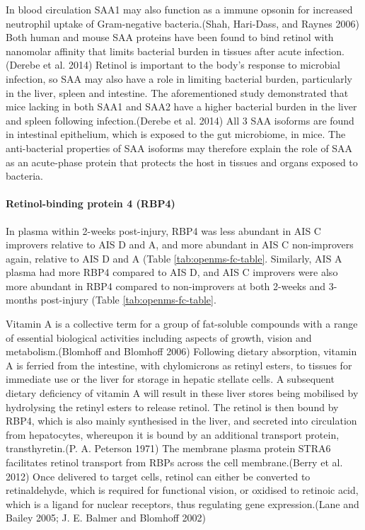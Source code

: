 \documentclass[9pt,lineno]{elife}
\begin{document}
\begin{landscape}
\begin{landscape}
In blood circulation SAA1 may also function as a immune opsonin for increased neutrophil uptake of Gram-negative bacteria.(Shah, Hari-Dass, and Raynes 2006) Both human and mouse SAA proteins have been found to bind retinol with nanomolar affinity that limits bacterial burden in tissues after acute infection.(Derebe et al. 2014) Retinol is important to the body's response to microbial infection, so SAA may also have a role in limiting bacterial burden, particularly in the liver, spleen and intestine.
The aforementioned study demonstrated that mice lacking in both SAA1 and SAA2 have a higher bacterial burden in the liver and spleen following infection.(Derebe et al. 2014) All 3 SAA isoforms are found in intestinal epithelium, which is exposed to the gut microbiome, in mice.
The anti-bacterial properties of SAA isoforms may therefore explain the role of SAA as an acute-phase protein that protects the host in tissues and organs exposed to bacteria.

\hypertarget{retinol-binding-protein-4-rbp4}{%
\paragraph{Retinol-binding protein 4 (RBP4)}\label{retinol-binding-protein-4-rbp4}}

In plasma within 2-weeks post-injury, RBP4 was less abundant in AIS C improvers relative to AIS D and A, and more abundant in AIS C non-improvers again, relative to AIS D and A (Table \ref{tab:openms-fc-table}.
Similarly, AIS A plasma had more RBP4 compared to AIS D, and AIS C improvers were also more abundant in RBP4 compared to non-improvers at both 2-weeks and 3-months post-injury (Table \ref{tab:openms-fc-table}.

Vitamin A is a collective term for a group of fat-soluble compounds with a range of essential biological activities including aspects of growth, vision and metabolism.(Blomhoff and Blomhoff 2006) Following dietary absorption, vitamin A is ferried from the intestine, with chylomicrons as retinyl esters, to tissues for immediate use or the liver for storage in hepatic stellate cells. A subsequent dietary deficiency of vitamin A will result in these liver stores being mobilised by hydrolysing the retinyl esters to release retinol. The retinol is then bound by RBP4, which is also mainly synthesised in the liver, and secreted into circulation from hepatocytes, whereupon it is bound by an additional transport protein, transthyretin.(P. A. Peterson 1971) The membrane plasma protein STRA6 facilitates retinol transport from RBPs across the cell membrane.(Berry et al. 2012) Once delivered to target cells, retinol can either be converted to retinaldehyde, which is required for functional vision, or oxidised to retinoic acid, which is a ligand for nuclear receptors, thus regulating gene expression.(Lane and Bailey 2005; J. E. Balmer and Blomhoff 2002)


\end{landscape}
\end{landscape}
\end{document}
